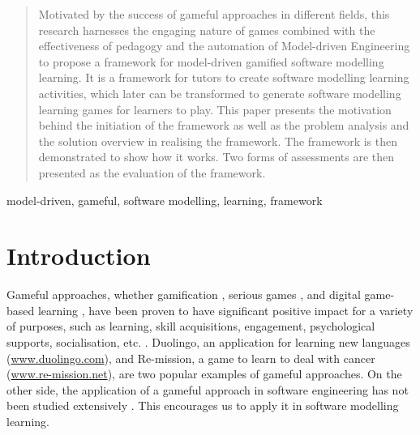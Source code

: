 \documentclass[conference]{IEEEtran}
\begin{document}
\maketitle

\begin{abstract}
\label{abstract}
Motivated by the success of gameful approaches in different fields, this research harnesses the engaging nature of games combined with the effectiveness of pedagogy and the automation of Model-driven Engineering to propose a framework for model-driven gamified software modelling learning. It is a framework for tutors to create software modelling learning activities, which later can be transformed to generate software modelling learning games for learners to play. This paper presents the motivation behind the initiation of the framework as well as the problem analysis and the solution overview in realising the framework. The framework is then demonstrated to show how it works. Two forms of assessments are then presented as the evaluation of the framework.
\end{abstract}

\begin{IEEEkeywords} 
model-driven, gameful, software modelling, learning, framework
\end{IEEEkeywords}



%
\IEEEpeerreviewmaketitle

\section{Introduction}
Gameful approaches, whether gamification \cite{stieglitz2016gamification}, serious games \cite{dorner2016serious}, and digital game-based learning \cite{san2015games}, have been proven to have significant positive impact for a variety of purposes, such as learning, skill acquisitions, engagement, psychological supports, socialisation, etc. \cite{connolly2012systematic, hamari2014does}. Duolingo, an application for learning new languages (\href{https://www.duolingo.com}{www.duolingo.com}), and Re-mission, a game to learn to deal with cancer (\href{http://www.re-mission.net}{www.re-mission.net}), are two popular examples of gameful approaches. On the other side, the application of a gameful approach in software engineering has not been studied extensively \cite{Pedreira2015}. This encourages us to apply it in software modelling learning. 
\end{document}
